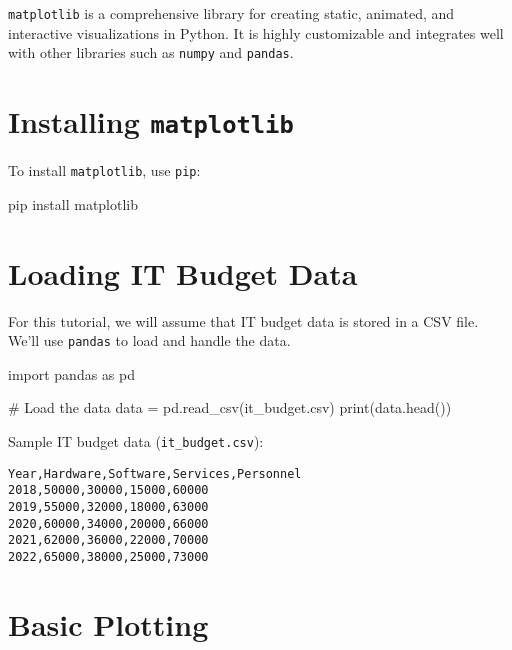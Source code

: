 \documentclass[
  letterpaper,
  DIV=11,
  numbers=noendperiod]{scrreprt}
\newenvironment{Shaded}{\begin{snugshade}}{\end{snugshade}}
\newcommand{\BuiltInTok}[1]{\textcolor[rgb]{0.00,0.23,0.31}{#1}}
\newcommand{\CommentTok}[1]{\textcolor[rgb]{0.37,0.37,0.37}{#1}}
\newcommand{\ExtensionTok}[1]{\textcolor[rgb]{0.00,0.23,0.31}{#1}}
\newcommand{\ImportTok}[1]{\textcolor[rgb]{0.00,0.46,0.62}{#1}}
\newcommand{\NormalTok}[1]{\textcolor[rgb]{0.00,0.23,0.31}{#1}}
\newcommand{\OperatorTok}[1]{\textcolor[rgb]{0.37,0.37,0.37}{#1}}
\newcommand{\StringTok}[1]{\textcolor[rgb]{0.13,0.47,0.30}{#1}}
\begin{document}
\texttt{matplotlib} is a comprehensive library for creating static,
animated, and interactive visualizations in Python. It is highly
customizable and integrates well with other libraries such as
\texttt{numpy} and \texttt{pandas}.

\section{\texorpdfstring{Installing
\texttt{matplotlib}}{Installing matplotlib}}\label{installing-matplotlib}

To install \texttt{matplotlib}, use \texttt{pip}:

\begin{Shaded}
\begin{Highlighting}[]
\ExtensionTok{pip}\NormalTok{ install matplotlib}
\end{Highlighting}
\end{Shaded}

\section{Loading IT Budget Data}\label{loading-it-budget-data}

For this tutorial, we will assume that IT budget data is stored in a CSV
file. We'll use \texttt{pandas} to load and handle the data.

\begin{Shaded}
\begin{Highlighting}[]
\ImportTok{import}\NormalTok{ pandas }\ImportTok{as}\NormalTok{ pd}

\CommentTok{\# Load the data}
\NormalTok{data }\OperatorTok{=}\NormalTok{ pd.read\_csv(}\StringTok{\textquotesingle{}it\_budget.csv\textquotesingle{}}\NormalTok{)}
\BuiltInTok{print}\NormalTok{(data.head())}
\end{Highlighting}
\end{Shaded}

Sample IT budget data (\texttt{it\_budget.csv}):

\begin{verbatim}
Year,Hardware,Software,Services,Personnel
2018,50000,30000,15000,60000
2019,55000,32000,18000,63000
2020,60000,34000,20000,66000
2021,62000,36000,22000,70000
2022,65000,38000,25000,73000
\end{verbatim}

\section{Basic Plotting}\label{basic-plotting}
\end{document}
